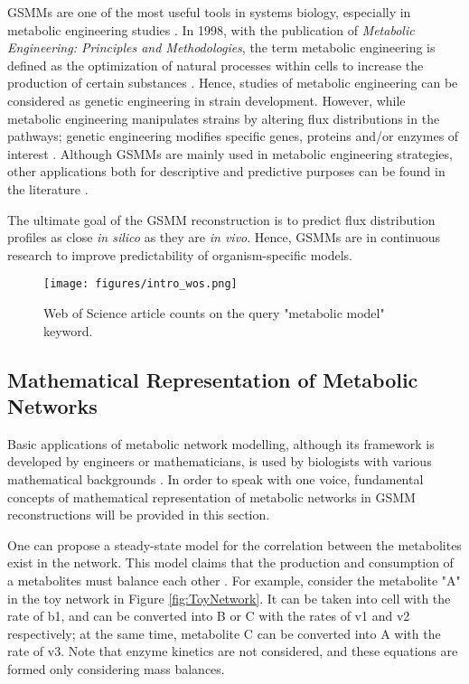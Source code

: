 GSMMs are one of the most useful tools in systems biology, especially in metabolic engineering studies \cite{kim2012recent}. In 1998, with the publication of \emph{Metabolic Engineering: Principles and Methodologies}, the term metabolic engineering is defined as the optimization of natural processes within cells to increase the production of certain substances \cite{stephanopoulos1999metabolic}. Hence, studies of metabolic engineering can be considered as genetic engineering in strain development. However, while metabolic engineering manipulates strains by altering flux distributions in the pathways; genetic engineering modifies specific genes, proteins and/or enzymes of interest \cite{stephanopoulos2012synthetic}. Although GSMMs are mainly used in metabolic engineering strategies, other applications both for descriptive and predictive purposes can be found in the literature \cite{osterlund2012fifteen}.

The ultimate goal of the GSMM reconstruction is to predict flux distribution profiles as close \emph{in silico} as they are \emph{in vivo}. Hence, GSMMs are in continuous research to improve predictability of organism-specific models.

\begin{figure}[ht]
\begin{center}
\texttt{[image: figures/intro\_wos.png]}
\end{center}
\caption[Web of Science article counts on the query "metabolic model" keyword]{Web of Science article counts on the query "metabolic model" keyword.}
\label{fig:wos_metabolicmodel}
\end{figure}

\subsection{Mathematical Representation of Metabolic Networks}
Basic applications of metabolic network modelling, although its framework is developed by engineers or mathematicians, is used by biologists with various mathematical backgrounds \cite{pinzon2018mathematical}. In order to speak with one voice, fundamental concepts of mathematical representation of metabolic networks in GSMM reconstructions will be provided in this section.

One can propose a steady-state model for the correlation between the metabolites exist in the network. This model claims that the production and consumption of a metabolites must balance each other \cite{reimers2016steady}. For example, consider the metabolite "A" in the toy network in Figure \ref{fig:ToyNetwork}. It can be taken into cell with the rate of b1, and can be converted into B or C with the rates of v1 and v2 respectively; at the same time, metabolite C can be converted into A with the rate of v3. Note that enzyme kinetics are not considered, and these equations are formed only considering mass balances.

